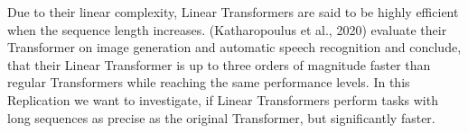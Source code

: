\documentclass[DIV=13,fontsize=11pt]{scrartcl}
\begin{document}
    


Due to their linear complexity, Linear Transformers are said to be highly efficient when the sequence length increases. (Katharopoulus et al., 2020) evaluate their Transformer on image generation and automatic speech recognition and conclude, that their Linear Transformer is up to three orders of magnitude faster than regular Transformers while reaching the same performance levels.  In this Replication we want to investigate, if Linear Transformers perform tasks with long sequences as precise as the original Transformer, but significantly faster. 
\end{document}
